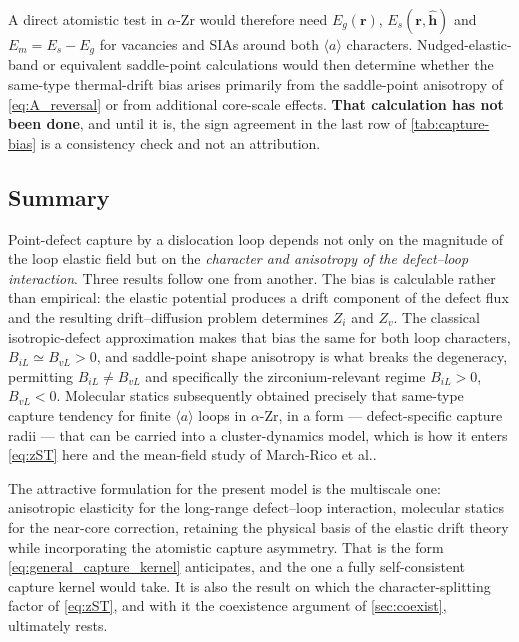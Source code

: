 \documentclass{article}
\newcommand{\aloop}{\ensuremath{\langle a\rangle}}
\begin{document}
A direct atomistic test in $\alpha$-Zr would therefore need $E_g(\bm r)$,
$E_s(\bm r,\hat{\bm h})$ and $E_m=E_s-E_g$ for vacancies and SIAs around both
\aloop{} characters. Nudged-elastic-band or equivalent saddle-point calculations
would then determine whether the same-type thermal-drift bias arises primarily
from the saddle-point anisotropy of \cref{eq:A_reversal} or from additional
core-scale effects. \textbf{That calculation has not been done}, and until it is,
the sign agreement in the last row of \cref{tab:capture-bias} is a consistency
check and not an attribution.

\subsection{Summary}

Point-defect capture by a dislocation loop depends not only on the magnitude of
the loop elastic field but on the \emph{character and anisotropy of the
defect--loop interaction}. Three results follow one from another. The bias is
calculable rather than empirical: the elastic potential produces a drift
component of the defect flux and the resulting drift--diffusion problem
determines $Z_i$ and $Z_v$. The classical isotropic-defect approximation makes
that bias the same for both loop characters, $B_{iL}\simeq B_{vL}>0$, and
saddle-point shape anisotropy is what breaks the degeneracy, permitting
$B_{iL}\neq B_{vL}$ and specifically the zirconium-relevant regime $B_{iL}>0$,
$B_{vL}<0$. Molecular statics subsequently obtained precisely that same-type
capture tendency for finite \aloop{} loops in $\alpha$-Zr, in a form ---
defect-specific capture radii --- that can be carried into a cluster-dynamics
model, which is how it enters \cref{eq:zST} here and the mean-field study of
March-Rico et al.\nobreakspace\citep{marchrico2025}.

The attractive formulation for the present model is the multiscale one: anisotropic
elasticity for the long-range defect--loop interaction, molecular statics for the
near-core correction, retaining the physical basis of the elastic drift theory
while incorporating the atomistic capture asymmetry. That is the form
\cref{eq:general_capture_kernel} anticipates, and the one a fully self-consistent
capture kernel would take. It is also the result on which the character-splitting
factor of \cref{eq:zST}, and with it the coexistence argument of
\cref{sec:coexist}, ultimately rests.

\end{document}
